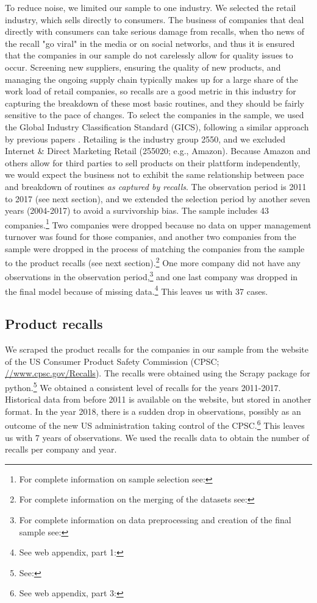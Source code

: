 To reduce noise, we limited our sample to one industry. We selected the retail industry, which sells directly to consumers. The business of companies that deal directly with consumers can take serious damage from recalls, when tho news of the recall "go viral" in the media or on social networks, and thus it is ensured that the companies in our sample do not carelessly allow for quality issues to occur. Screening new suppliers, ensuring the quality of new products, and managing the ongoing supply chain typically makes up for a large share of the work load of retail companies, so recalls are a good metric in this industry for capturing the breakdown of these most basic routines, and they should be fairly sensitive to the pace of changes. To select the companies in the sample, we used the Global Industry Classification Standard (GICS), following a similar approach by previous papers \citep{Wowak2015, Baum2003}. Retailing is the industry group 2550, and we excluded Internet \& Direct Marketing Retail (255020; e.g., Amazon). Because Amazon and others allow for third parties to sell products on their plattform independently, we would expect the business not to exhibit the same relationship between pace and breakdown of routines \textit{as captured by recalls}. The observation period is 2011 to 2017 (see next section), and we extended the selection period by another seven years (2004-2017) to avoid a survivorship bias. The sample includes 43 companies.\footnote{For complete information on sample selection see: \datacollection} Two companies were dropped because no data on upper management turnover was found for those companies, and another two companies from the sample were dropped in the process of matching the companies from the sample to the product recalls (see next section).\footnote{For complete information on the merging of the datasets see: \matching} One more company did not have any observations in the observation period,\footnote{For complete information on data preprocessing and creation of the final sample see: \preprocessing} and one last company was dropped in the final model because of missing data.\footnote{See web appendix, part 1: \webappendix} This leaves us with 37 cases.

\subsection{Product recalls}

We scraped the product recalls for the companies in our sample from the website of the US Consumer Product Safety Commission (CPSC; \url{//www.cpsc.gov/Recalls}). The recalls were obtained using the Scrapy package for python.\footnote{See: \spider} We obtained a consistent level of recalls for the years 2011-2017. Historical data from before 2011 is available on the website, but stored in another format. In the year 2018, there is a sudden drop in observations, possibly as an outcome of the new US administration taking control of the CPSC.\footnote{See web appendix, part 3: \webappendix} This leaves us with 7 years of observations. We used the recalls data to obtain the number of recalls per company and year.

